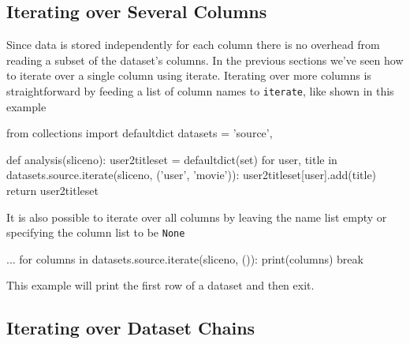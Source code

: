 \documentclass[a4paper]{article}
\begin{document}
\subsection{Iterating over Several Columns}
Since data is stored independently for each column there is no
overhead from reading a subset of the dataset's columns.  In the
previous sections we've seen how to iterate over a single column using
iterate.  Iterating over more columns is straightforward by feeding a
list of column names to \texttt{iterate}, like shown in this example
\begin{python}
from collections import defaultdict
datasets = {'source',}

def analysis(sliceno):
  user2titleset = defaultdict(set)
  for user, title in datasets.source.iterate(sliceno, ('user', 'movie')):
    user2titleset[user].add(title)
  return user2titleset
\end{python}
It is also possible to iterate over all columns by leaving the name
list empty or specifying the column list to be \texttt{None}
\begin{python}
  ...
  for columns in datasets.source.iterate(sliceno, ()):
    print(columns)
    break
\end{python}
This example will print the first row of a dataset and then exit.

\clearpage




\subsection{Iterating over Dataset Chains}
\end{document}
